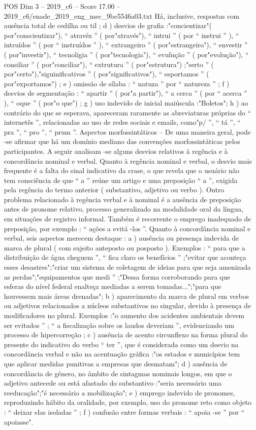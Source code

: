 \begin{textsample}{POS Dim 3 – 2019\_c6 – Score 17.00 – 2019\_c6/enade\_2019\_eng\_mec\_9be5546a03.txt}
Há, inclusive, respostas com ausência total de cedilha ou til ; d ) desvios de grafia :"concientizar"( por"conscientizar"), “ atravéz ” ( por"através"), “ intrui ” ( por “ instrui ” ), “ intruídos ” ( por “ instruídos ” ), “ extrangeiro ” ( por"estrangeiro"), “ envestir ” ( por"investir"), “ tecnoligia ” ( por"tecnologia"), “ evulução ” ( por"evolução"), “ consiliar ” ( por"conciliar"), “ extrutura ” ( por"estrutura") ;"serto ” ( por"certo"),"siguinificativos ” ( por"significativos"), “ esportamos ” ( por"exportamos") ; e ) omissão de sílaba : “ natuza ” por “ natureza ” ; f ) desvios de segmentação : “ apartir ” ( por"a partir"), “ a cerca ” ( por “ acerca ” ), “ oque ” ( por"o que") ; g ) uso indevido de inicial maiúscula :"Boletos"; h ) ao contrário do que se esperava, apareceram raramente as abreviaturas próprias do “ internetês ”, relacionadas ao uso de redes sociais e emails, como"p/ ”, “ tá ”, “ pra ”, “ pro ”, “ prum ”.
Aspectos morfossintáticos – De uma maneira geral, pode -se afirmar que há um domínio mediano das convenções morfossintáticas pelos participantes.
A seguir analisam -se alguns desvios relativos à regência e à concordância nominal e verbal.
Quanto à regência nominal e verbal, o desvio mais frequente é a falta do sinal indicativo da crase, o que revela que o usuário não tem consciência de que “ a ” reúne um artigo e uma preposição “ a ”, exigida pela regência do termo anterior ( substantivo, adjetivo ou verbo ).
Outro problema relacionado à regência verbal e à nominal é a ausência de preposição antes de pronome relativo, processo generalizado na modalidade oral da língua, em situações de registro informal.
Também é recorrente o emprego inadequado de preposição, por exemplo : “ ações a evitá -los ”.
Quanto à concordância nominal e verbal, seis aspectos merecem destaque : a ) ausência ou presença indevida de marca de plural ( com sujeito anteposto ou posposto ).
Exemplos : “ para que a distribuição de água cheguem ”, “ fica claro os benefícios ” ;"evitar que aconteça esses desastres";"criar um sistema de coletagem de ideias para que seja amenizada as perdas";"equipamentos que medi ” ;"Dessa forma corroborando para que esferas do nível federal enalteça mediadas a serem tomadas...";"para que houvessem mais áreas drenadas"; b ) aparecimento da marca de plural em verbos ou adjetivos relacionados a núcleos substantivos no singular, devido à presença de modificadores no plural.
Exemplos :"o aumento dos acidentes ambientais devem ser evitados ” ; “ a fiscalização sobre os laudos deveriam ”, evidenciando um processo de hipercorreção ; c ) ausência de acento circunflexo na forma plural do presente do indicativo do verbo “ ter ”, que é considerada como um desvio na concordância verbal e não na acentuação gráfica :"os estados e municípios tem que aplicar medidas punitivas a empresas que desmatam"; d ) ausência de concordância de gênero, no âmbito de sintagmas nominais longos, em que o adjetivo antecede ou está afastado do substantivo :"seria necessário uma reeducação";"é necessário a mobilização"; e ) emprego indevido de pronomes, reproduzindo hábito da oralidade, por exemplo, uso do pronome reto como objeto : “ deixar elas isoladas ” ; f ) confusão entre formas verbais : “ apoia -se ” por “ apoiasse".

\end{textsample}
